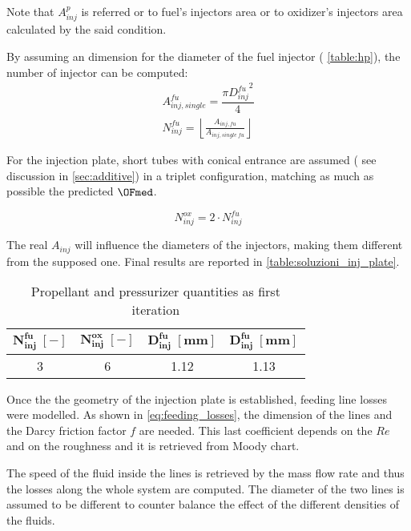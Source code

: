 Note that $ A_{inj}^p$ is referred or to fuel's injectors area or to oxidizer's injectors area calculated by the said condition.

By assuming an dimension for the diameter of the fuel injector ( \autoref{table:hp}), the number of injector can be computed: 
\vspace{-0.5cm}
\begin{gather}
    A_{inj, single}^{fu} = \dfrac{\pi {D_{inj}^{fu}}^2}{4}
    \label{eq:aree_inj}
    \\
    N_{inj}^{fu} = \left\lfloor \frac{A_{inj,fu}}{A_{inj,single\;fu}}\right\rfloor
    \label{eq:number_fu_inj}
\end{gather}

For the injection plate, short tubes with conical entrance are assumed ( see discussion in \autoref{sec:additive}) in a triplet configuration, matching as much as possible the predicted $\OFmed$.

\begin{equation}
    N_{inj}^{ox} = 2 \cdot N_{inj}^{fu}
    \label{eq:number_ox_inj}
\end{equation} 

The real $ A_{inj}$ will influence the diameters of the injectors, making them different from the supposed one. Final results are reported in \autoref{table:soluzioni_inj_plate}.

\begin{table}[H]
    \renewcommand{\arraystretch}{1.5}
    \centering
    \begin{tabular}{|c|c|c|c|}
        \hline
        $\boldsymbol{N_{inj}^{fu}\; [-]}$ & $\boldsymbol{N_{inj}^{ox}\; [-]}$ & $\boldsymbol{D_{inj}^{fu} \; [\textbf{mm}]}$ & $\boldsymbol{D_{inj}^{fu} \; [\textbf{mm}]}$ \\
        \hline
        \hline
        3 & 6 & 1.12 & 1.13 \\
        \hline
    \end{tabular}
    \caption{Propellant and pressurizer quantities as first iteration}
    \label{table:soluzioni_inj_plate}
\end{table}


Once the the geometry of the injection plate is established, feeding line losses were modelled. As shown in \autoref{eq:feeding_losses}, the dimension of the lines and the Darcy friction factor $f$ are needed. This last coefficient depends on the $Re$ and on the roughness and it is retrieved from Moody chart\cite{colebrook}. 

The speed of the fluid inside the lines is retrieved by the mass flow rate and thus the losses along the whole system are computed. The diameter of the two lines is assumed to be different to counter balance the effect of the different densities of the fluids.

